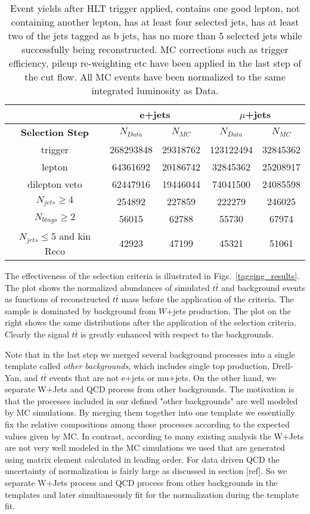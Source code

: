 \documentclass{cmspaperpdf}
\begin{document}
\begin{table}[h!]
\small
\centering
\begin{tabular}{|c | c  c | c  c|}
\hline
 & \multicolumn{2}{|c|}{e+jets}&\multicolumn{2}{|c|}{$\mu$+jets} \\
\hline
\textbf{Selection Step} & $N_{Data}$ & $N_{MC}$ & $N_{Data}$ & $N_{MC}$ \\
\hline
trigger & 268293848 & 29318762 & 123122494 & 32845362  \\
lepton & 64361692 & 20186742 & 32845362 & 25208917 \\ 
dilepton veto & 62447916 & 19446044 & 74041500 & 24085598  \\ 
$N_{jets}\geqslant4$ & 254892 & 227859 & 222279 & 246025  \\
$N_{btags}\geqslant2$ & 56015 & 62788 & 55730 & 67974  \\
$N_{jets}\leqslant5$ and kin Reco & 42923 & 47199 & 45321 & 51061  \\
\hline
\end{tabular}
\caption{\small Event yields after HLT trigger applied, contains one good lepton, not containing another lepton, has at least four selected jets, has at least two of the jets tagged as b jets, has no more than 5 selected jets while successfully being reconstructed. MC corrections such as trigger efficiency, pileup re-weighting etc have been applied in the last step of the cut flow. All MC events have been normalized to the same integrated luminosity as Data.}

\label{tab:cut-flow}
\end{table}

The effectiveness of the selection criteria is illustrated in Figs.~\ref{tagging_results}.  The plot shows the normalized abundances of simulated $t\bar t$ and background events as functions of reconstructed $t\bar t$ mass before the application of the criteria.  The sample is dominated by background from $W$+jets production.  The plot on the right shows the same distributions after the application of the selection criteria.  Clearly the signal $t\bar{t}$ is greatly enhanced with respect to the backgrounds.   

Note that in the last step we merged several background processes into a single template called {\it other backgrounds}, which includes single top production, Drell-Yan, and $t\bar{t}$ events that are not e+jets or mu+jets.  On the other hand, we separate W+Jets and QCD process from other backgrounds. The motivation is that the processes included in our defined "other backgrounds" are well modeled by MC simulations. By merging them together into one template we essentially fix the relative compositions among those processes according to the expected values given by MC.  In contrast, according to many existing analysis the W+Jets are not very well modeled in the MC simulations we used that are generated using matrix element calculated in leading order. For data driven QCD the uncertainty of normalization is fairly large as discussed in section [ref].  So we separate W+Jets process and QCD process from other backgrounds in the templates and later simultaneously fit for the normalization during the template fit.
\end{document}
